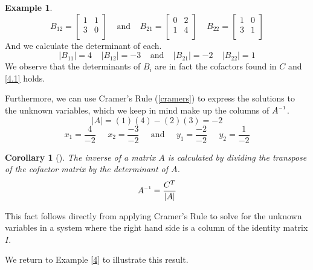 \documentclass[11pt,reqno]{amsart}
\newtheorem{corollary}[theorem]{Corollary}
\theoremstyle{definition}
\newtheorem{example}[theorem]{Example}
\newcommand{\inv}{^{\raisebox{.2ex}{$\scriptscriptstyle-1$}}}
\begin{document}
\begin{example}
\[B_{12} = \begin{bmatrix}
    1 & 1\\
    3 & 0\\
\end{bmatrix}\;\;\;\; \text{and} \;\;\;\;
B_{21} = \begin{bmatrix}
    0 & 2\\
    1 & 4\\
\end{bmatrix}\;\;\;\;
B_{22} = \begin{bmatrix}
    1 & 0\\
    3 & 1\\
\end{bmatrix}
\]
And we calculate the determinant of each.
\[
|B_{11}| = 4 \;\;\;\;
|B_{12}| = -3 \;\;\;\; \text{and}\;\;\;\;
|B_{21}| = -2 \;\;\;\;
|B_{22}| = 1 
\]
We observe that the determinants of $B_i$ are in fact the cofactors found in $C$ and \ref{4.1} holds.
\end{example}
Furthermore, we can use Cramer's Rule (\ref{cramers}) to express the solutions to the unknown variables, which we keep in mind make up the columns of $A\inv$.
\[
|A| = (1)(4) - (2)(3) = -2
\]
\[
x_1 = \frac{4}{-2}
\;\;\;\;\; x_2 = \frac{-3}{-2}\;\;\;\;\; \text{and}
\;\;\;\;\;y_1 = \frac{-2}{-2}
\;\;\;\;\;y_2 = \frac{1}{-2}
\]

\begin{corollary}[{\cite[5.3.6]{strang}}] The inverse of a matrix $A$ is calculated by dividing the transpose of the cofactor matrix by the determinant of $A$.
\[
A\inv = \frac{C^T}{|A|}
\]

\end{corollary}

This fact follows directly from applying Cramer's Rule to solve for the unknown variables in a system where the right hand side is a column of the identity matrix $I$.


We return to Example \ref{4} to illustrate this result.
\end{document}
